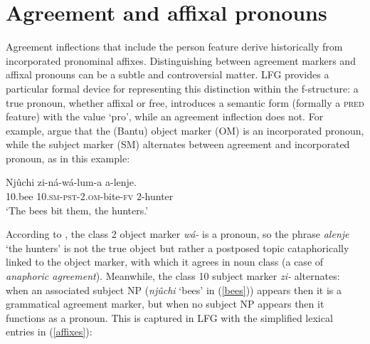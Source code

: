 \section{Agreement and affixal pronouns}
\label{sec:agre-affix-pron}

Agreement inflections that include the person feature derive historically from incorporated pronominal affixes.  Distinguishing between agreement markers and affixal pronouns can be a subtle and controversial matter.  LFG provides a particular formal device for representing this distinction within the f-structure:  a true pronoun, whether affixal or free, introduces a semantic form (formally a \textsc{pred} feature) with the value `{pro}', while an agreement inflection does not.  
For example, \citet{bresnan+mchombo:1987} argue that the  (Bantu) object marker ({OM}) is an incorporated pronoun, while the subject marker ({SM}) alternates between agreement and incorporated pronoun, as in this example: 


 \begin{exe} 
\ex	\label{bees}
{\gll Nj\^{u}chi   zi-n\'a-w\'{a}-lum-a  a-lenje. \\
 10.bee 10.\textsc{sm}-\textsc{pst}-2.\textsc{om}-bite-\textsc{fv} 2-hunter \\
\glt `The bees bit them, the hunters.' }
\end{exe}

\noindent
According to \citet{bresnan+mchombo:1987},  the class 2 object marker \textit{w\'{a}-} is a pronoun, so the phrase \textit{alenje} `the hunters' is not the true object but rather a postposed topic cataphorically linked to the object marker, with which it agrees in noun class (a case of \textit{anaphoric agreement}).  Meanwhile, the class 10 subject marker \textit{zi-} alternates: when an associated subject NP (\textit{njûchi} ‘bees’ in (\ref{bees})) appears then it is a grammatical agreement marker, but when no subject NP appears then it functions as a pronoun.  This is captured in LFG with the simplified lexical entries in (\ref{affixes}):

\eal 
 \label{affixes}
 \zl 
 
